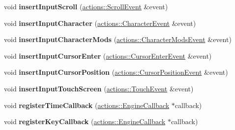 \begin{DoxyCompactItemize}
\item 
\hypertarget{classfillwave_1_1Engine_abc1d359828cf055ef09abeac5f5b39b1}{}void {\bfseries insert\+Input\+Scroll} (\hyperlink{classfillwave_1_1actions_1_1ScrollEvent}{actions\+::\+Scroll\+Event} \&event)\label{classfillwave_1_1Engine_abc1d359828cf055ef09abeac5f5b39b1}

\item 
\hypertarget{classfillwave_1_1Engine_ace0064c0b6223910e6924fa0df32c6ac}{}void {\bfseries insert\+Input\+Character} (\hyperlink{classfillwave_1_1actions_1_1CharacterEvent}{actions\+::\+Character\+Event} \&event)\label{classfillwave_1_1Engine_ace0064c0b6223910e6924fa0df32c6ac}

\item 
\hypertarget{classfillwave_1_1Engine_a1d533273542291e94666e02bdf2035a6}{}void {\bfseries insert\+Input\+Character\+Mods} (\hyperlink{classfillwave_1_1actions_1_1CharacterModsEvent}{actions\+::\+Character\+Mods\+Event} \&event)\label{classfillwave_1_1Engine_a1d533273542291e94666e02bdf2035a6}

\item 
\hypertarget{classfillwave_1_1Engine_a1d9c62c6b661e6107493a5b389ad85e0}{}void {\bfseries insert\+Input\+Cursor\+Enter} (\hyperlink{classfillwave_1_1actions_1_1CursorEnterEvent}{actions\+::\+Cursor\+Enter\+Event} \&event)\label{classfillwave_1_1Engine_a1d9c62c6b661e6107493a5b389ad85e0}

\item 
\hypertarget{classfillwave_1_1Engine_aa3f48adc90b541d8aa0baddf08aa9cde}{}void {\bfseries insert\+Input\+Cursor\+Position} (\hyperlink{classfillwave_1_1actions_1_1CursorPositionEvent}{actions\+::\+Cursor\+Position\+Event} \&event)\label{classfillwave_1_1Engine_aa3f48adc90b541d8aa0baddf08aa9cde}

\item 
\hypertarget{classfillwave_1_1Engine_ab5968055d7a39120d2137ee0403bdc54}{}void {\bfseries insert\+Input\+Touch\+Screen} (\hyperlink{classfillwave_1_1actions_1_1TouchEvent}{actions\+::\+Touch\+Event} \&event)\label{classfillwave_1_1Engine_ab5968055d7a39120d2137ee0403bdc54}

\item 
\hypertarget{classfillwave_1_1Engine_a2076d62acd110d2677d7ed31c6340c86}{}void {\bfseries register\+Time\+Callback} (\hyperlink{classfillwave_1_1actions_1_1EngineCallback}{actions\+::\+Engine\+Callback} $\ast$callback)\label{classfillwave_1_1Engine_a2076d62acd110d2677d7ed31c6340c86}

\item 
\hypertarget{classfillwave_1_1Engine_a7b108f71e8ecab314fe18f281ebb1ee8}{}void {\bfseries register\+Key\+Callback} (\hyperlink{classfillwave_1_1actions_1_1EngineCallback}{actions\+::\+Engine\+Callback} $\ast$callback)\label{classfillwave_1_1Engine_a7b108f71e8ecab314fe18f281ebb1ee8}


\end{DoxyCompactItemize}
